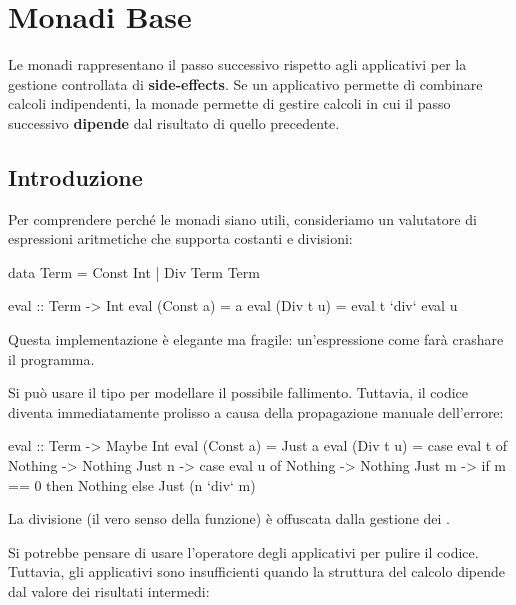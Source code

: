 \section{Monadi Base}
Le monadi rappresentano il passo successivo rispetto agli applicativi per la gestione controllata di \textbf{side-effects}. Se un applicativo permette di combinare calcoli indipendenti, la monade permette di gestire calcoli in cui il passo successivo \textbf{dipende} dal risultato di quello precedente.

\subsection{Introduzione}
Per comprendere perché le monadi siano utili, consideriamo un valutatore di espressioni aritmetiche che supporta costanti e divisioni:

\begin{haskellbox}{}
data Term = Const Int | Div Term Term

eval :: Term -> Int
eval (Const a) = a
eval (Div t u) = eval t `div` eval u
\end{haskellbox}

Questa implementazione è elegante ma fragile: un'espressione come  farà crashare il programma.

Si può usare il tipo  per modellare il possibile fallimento. Tuttavia, il codice diventa immediatamente prolisso a causa della propagazione manuale dell'errore:

\begin{haskellbox}{}
eval :: Term -> Maybe Int
eval (Const a) = Just a
eval (Div t u) = case eval t of
                   Nothing -> Nothing
                   Just n  -> case eval u of
                                Nothing -> Nothing
                                Just m  -> if m == 0 then Nothing 
                                           else Just (n `div` m)
\end{haskellbox}

La divisione (il vero senso della funzione) è offuscata dalla gestione dei .

Si potrebbe pensare di usare l'operatore \code{<*>} degli applicativi per pulire il codice. Tuttavia, gli applicativi sono insufficienti quando la struttura del calcolo dipende dal valore dei risultati intermedi:


